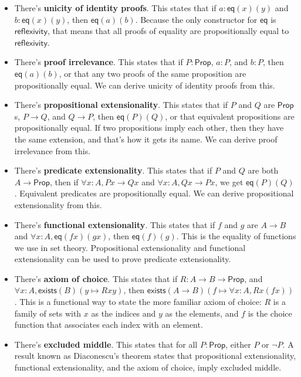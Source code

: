 \documentclass[11pt,paper=letter]{scrartcl}
\renewcommand{\sf}{\mathsf}
\renewcommand{\lnot}{\neg}
\newcommand{\prop}{\mathsf{Prop}}
\begin{document}
\begin{itemize}
\item There's \textbf{unicity of identity proofs}. This states that if $a: \sf{eq}(x)(y)$ and $b: \sf{eq}(x)(y)$, then $\sf{eq}(a)(b)$. Because the only constructor for $\sf{eq}$ is $\sf{reflexivity}$, that means that all proofs of equality are propositionally equal to $\sf{reflexivity}$.

\item There's \textbf{proof irrelevance}. This states that if $P : \prop$, $a : P$, and $b : P$, then $\sf{eq}(a)(b)$, or that any two proofs of the same proposition are propositionally equal. We can derive unicity of identity proofs from this.

\item There's \textbf{propositional extensionality}. This states that if $P$ and $Q$ are $\prop$s, $P \to Q$, and $Q \to P$, then $\sf{eq}(P)(Q)$, or that equivalent propositions are propositionally equal. If two propositions imply each other, then they have the same extension, and that's how it gets its name. We can derive proof irrelevance from this.

\item There's \textbf{predicate extensionality}. This states that if $P$ and $Q$ are both $A \to \prop$, then if $\forall x : A, Px \to Qx$ and $\forall x : A, Qx \to Px$, we get $\sf{eq}(P)(Q)$. Equivalent predicates are propositionally equal. We can derive propositional extensionality from this.

\item There's \textbf{functional extensionality}. This states that if $f$ and $g$ are $A \to B$ and $\forall x: A, \sf{eq}(fx)(gx)$, then $\sf{eq}(f)(g)$. This is the equality of functions we use in set theory. Propositional extensionality and functional extensionality can be used to prove predicate extensionality.

\item There's \textbf{axiom of choice}. This states that if $R: A \to B \to \prop$, and $\forall x: A, \sf{exists}(B)(y \mapsto Rxy)$, then $\sf{exists}(A \to B)(f \mapsto \forall x: A, Rx(fx))$. This is a functional way to state the more familiar axiom of choice: $R$ is a family of sets with $x$ as the indices and $y$ as the elements, and $f$ is the choice function that associates each index with an element.

\item There's \textbf{excluded middle}. This states that for all $P: \prop$, either $P$ or $\lnot P$. A result known as Diaconescu's theorem states that propositional extensionality, functional extensionality, and the axiom of choice, imply excluded middle.
\end{itemize}
\end{document}

